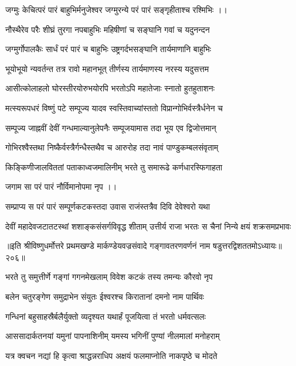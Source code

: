 \twolineshloka
{जग्मुः केचित्परं पारं बाहुभिर्मनुजेश्वर}
{जग्मुरन्ये परं पारं सङ्गृहीताश्च रश्मिभिः ।।}%

\twolineshloka
{नौस्थैरेव परैः शीघ्रं तुरगा नपबाहुभिः}
{महिषीणां च सङ्घानि गवां च यदुनन्दन} %

\twolineshloka
{जग्मुर्गोपालकैः सार्धं परं पारं च बाहुभिः}
{उष्ट्रगर्दभसङ्घानि तार्यमाणानि बाहुभिः}%

\twolineshloka
{भूयोभूयो न्यवर्तन्त तत्र रावो महानभूत्}
{तीर्णस्य तार्यमाणस्य नरस्य यदुसत्तम}%

\twolineshloka
{आसीत्कोलाहलो घोरस्तीरयोरुभयोरपि}
{भरतोऽपि महातेजाः स्नातो हुतहुताशनः}%

\twolineshloka
{मत्स्यरूपधरं विष्णुं पटे सम्पूज्य यादव}
{स्वस्तिवाच्यांस्ततो विप्रान्गोभिर्वस्त्रैर्धनेन च}%

\twolineshloka
{सम्पूज्य जाह्नवीं देवीं गन्धमाल्यानुलेपनैः}
{सम्पूजयामास तदा भूय एव द्विजोत्तमान्}%

\twolineshloka
{गोभिरश्वैस्तथा निष्कैर्वस्त्रैर्गन्धैस्तथैव च}
{आरुरोह तदा नावं पाण्डुकम्बलसंवृताम्}%

\twolineshloka
{किङ्किणीजालविततां पताकाध्वजमालिनीम्}
{भरते तु समारूढे कर्णधारस्फिगाहता}%

जगाम सा परं पारं नौर्विमानोपमा नृप ।।

\twolineshloka
{सम्प्राप्य स परं पारं सम्पूर्णकटकस्तदा}
{उवास राजंस्तत्रैव दिवि देवेश्वरो यथा}%

\twolineshloka
{देवीं महादेवजटातटस्थां शशाङ्कसंसर्गविवृद्ध शीताम्}
{उत्तीर्य राजा भरतः स चैनां निन्ये क्षयं शक्रसमप्रभावः}%

॥इति श्रीविष्णुधर्मोत्तरे प्रथमखण्डे मार्कण्डेयवज्रसंवादे गङ्गावतरणवर्णनं नाम षडुत्तरद्विशततमोऽध्यायः॥२०६॥



\twolineshloka
{भरते तु समुत्तीर्णे गङ्गां गगनमेखलाम्}
{विवेश कटकं तस्य तमन्यः कौरवो नृप}%

\twolineshloka
{बलेन चतुरङ्गेण समुद्राभेन संयुतः}
{ईश्वरश्च किरातानां दमनो नाम पार्थिवः}%

\twolineshloka
{गन्धिनां बहुसाहस्रैर्बलैर्युक्तो व्यदृश्यत}
{यथार्हं पूजयित्वा तं भरतो धर्मवत्सलः}%

\twolineshloka
{आससादार्कतनयां यमुनां पापनाशिनीम्}
{यमस्य भगिनीं पुण्यां नीलमालां मनोहराम्}%

\twolineshloka
{यत्र क्वचन नद्यां हि कृत्वा श्राद्धन्नराधिप}
{अक्षयं फलमाप्नोति नाकपृष्ठे च मोदते}%

